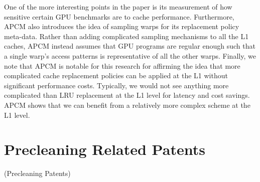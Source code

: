 One of the more interesting points in the paper is its measurement of how sensitive certain GPU benchmarks are to cache performance. Furthermore, APCM also introduces the idea of sampling warps for its replacement policy meta-data. Rather than adding complicated sampling mechanisms to all the L1 caches, APCM instead assumes that GPU programs are regular enough such that a single warp's access patterns is representative of all the other warps. Finally, we note that APCM is notable for this research for affirming the idea that more complicated cache replacement policies can be applied at the L1 without significant performance costs. Typically, we would not see anything more complicated than LRU replacement at the L1 level for latency and cost savings. APCM shows that we can benefit from a relatively more complex scheme at the L1 level.

\section{Precleaning Related Patents}
(Precleaning Patents)
